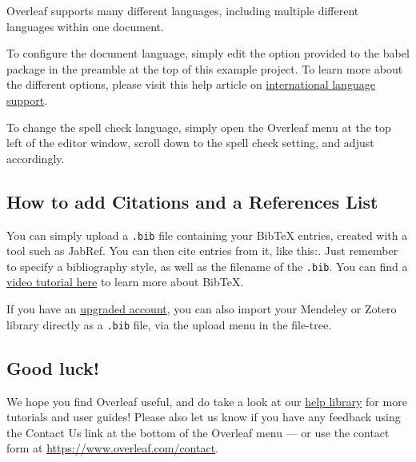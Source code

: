 \documentclass{article}
\begin{document}
Overleaf supports many different languages, including multiple different languages within one document. 

To configure the document language, simply edit the option provided to the babel package in the preamble at the top of this example project. To learn more about the different options, please visit this help article on \href{https://www.overleaf.com/learn/latex/International_language_support}{international language support}.

To change the spell check language, simply open the Overleaf menu at the top left of the editor window, scroll down to the spell check setting, and adjust accordingly.

\subsection{How to add Citations and a References List}

You can simply upload a \verb|.bib| file containing your BibTeX entries, created with a tool such as JabRef. You can then cite entries from it, like this:. Just remember to specify a bibliography style, as well as the filename of the \verb|.bib|. You can find a \href{https://www.overleaf.com/help/97-how-to-include-a-bibliography-using-bibtex}{video tutorial here} to learn more about BibTeX.

If you have an \href{https://www.overleaf.com/user/subscription/plans}{upgraded account}, you can also import your Mendeley or Zotero library directly as a \verb|.bib| file, via the upload menu in the file-tree.

\subsection{Good luck!}

We hope you find Overleaf useful, and do take a look at our \href{https://www.overleaf.com/learn}{help library} for more tutorials and user guides! Please also let us know if you have any feedback using the Contact Us link at the bottom of the Overleaf menu --- or use the contact form at \url{https://www.overleaf.com/contact}.



\end{document}
